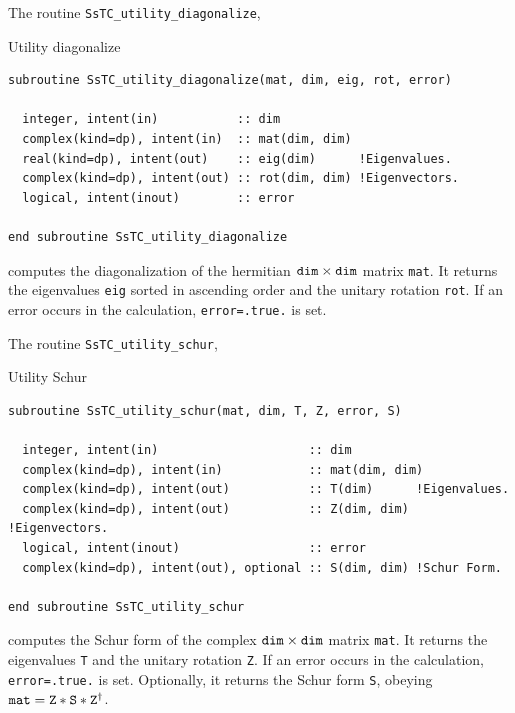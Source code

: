 \documentclass[10pt,a4paper]{article}
\begin{document}
The routine \verb|SsTC_utility_diagonalize|,
\begin{codebox}{Utility diagonalize}
\begin{lstlisting}[caption={Interface of ``utility diagonalize".},captionpos=b]
subroutine SsTC_utility_diagonalize(mat, dim, eig, rot, error)

  integer, intent(in)           :: dim
  complex(kind=dp), intent(in)  :: mat(dim, dim)
  real(kind=dp), intent(out)    :: eig(dim)      !Eigenvalues.
  complex(kind=dp), intent(out) :: rot(dim, dim) !Eigenvectors.
  logical, intent(inout)        :: error

end subroutine SsTC_utility_diagonalize
\end{lstlisting}
\end{codebox}
computes the diagonalization of the hermitian $\verb|dim|\times\verb|dim|$ matrix \verb|mat|. It returns the eigenvalues \verb|eig| sorted in ascending order and the unitary rotation \verb|rot|. If an error occurs in the calculation, \verb|error=.true.| is set.

The routine \verb|SsTC_utility_schur|,
\begin{codebox}{Utility Schur}
\begin{lstlisting}[caption={Interface of ``utility Schur".},captionpos=b]
subroutine SsTC_utility_schur(mat, dim, T, Z, error, S)

  integer, intent(in)                     :: dim
  complex(kind=dp), intent(in)            :: mat(dim, dim)
  complex(kind=dp), intent(out)           :: T(dim)      !Eigenvalues.
  complex(kind=dp), intent(out)           :: Z(dim, dim) !Eigenvectors.
  logical, intent(inout)                  :: error
  complex(kind=dp), intent(out), optional :: S(dim, dim) !Schur Form.
  
end subroutine SsTC_utility_schur
\end{lstlisting}
\end{codebox}
computes the Schur form of the complex $\verb|dim|\times\verb|dim|$ matrix \verb|mat|. It returns the eigenvalues \verb|T| and the unitary rotation \verb|Z|. If an error occurs in the calculation, \verb|error=.true.| is set. Optionally, it returns the Schur form \verb|S|, obeying $\verb|mat|= \verb|Z|*\verb|S|*\verb|Z|^{\dagger}$.
\end{document}
